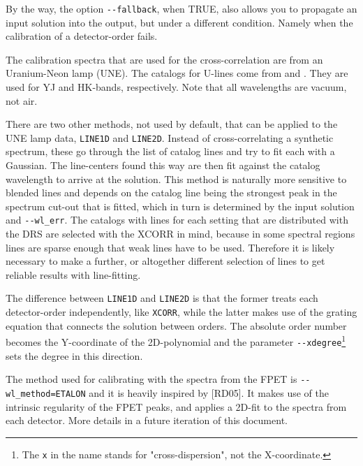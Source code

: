 By the way, the option \verb!--fallback!, when TRUE, also allows you to propagate an input solution into the output, but under a different condition. Namely when the calibration of a detector-order fails.

The calibration spectra that are used for the cross-correlation are from an
Uranium-Neon lamp (UNE). The catalogs for U-lines come from
\cite{2018A&A...618A.118S} and \cite{2011ApJS..195...24R}. They are used for YJ
and HK-bands, respectively. Note that all wavelengths are vacuum, not air.

There are two other methods, not used by default, that can be applied to the UNE
lamp data, \verb!LINE1D! and \verb!LINE2D!. Instead of cross-correlating a
synthetic spectrum, these go through the list of catalog lines and try to fit
each with a Gaussian. The line-centers found this way are then fit against the
catalog wavelength to arrive at the solution. This method is naturally more
sensitive to blended lines and depends on the catalog line being the strongest
peak in the spectrum cut-out that is fitted, which in turn is determined by the
input solution and \verb!--wl_err!. The catalogs with lines for each setting
that are distributed with the DRS are selected with the XCORR in mind, because
in some spectral regions lines are sparse enough that weak lines have to be
used. Therefore it is likely necessary to make a further, or altogether
different selection of lines to get reliable results with line-fitting.

The difference between \verb!LINE1D! and \verb!LINE2D! is that the former treats
each detector-order independently, like \verb!XCORR!, while the latter makes use
of the grating equation that connects the solution between orders. The absolute
order number becomes the Y-coordinate of the 2D-polynomial and the parameter
\verb!--xdegree!\footnote{The \texttt{x} in the name stands for
"cross-dispersion", not the X-coordinate.} sets the degree in this direction.




The method used for calibrating with the spectra from the FPET is
\verb!--wl_method=ETALON! and it is heavily inspired by
[RD05]\cite{2019A&A...624A.122C}. It makes use of the intrinsic regularity of
the FPET peaks, and applies a 2D-fit to the spectra from each detector. More
details in a future iteration of this document.



